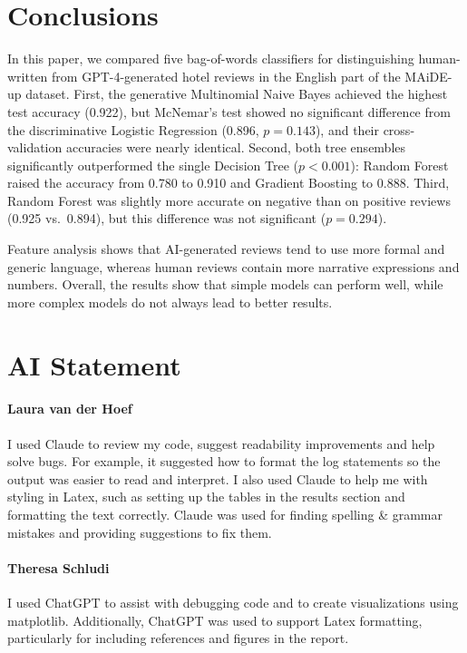 \documentclass[pmlr]{jmlr}%
\begin{document}
\section{Conclusions}
\label{sec:conclusions}

In this paper, we compared five bag-of-words classifiers for distinguishing human-written from GPT-4-generated hotel reviews in the English part of the MAiDE-up dataset.
First, the generative Multinomial Naive Bayes achieved the highest test accuracy (0.922), but McNemar's test showed no significant difference from the discriminative Logistic Regression (0.896, $p = 0.143$), and their cross-validation accuracies were nearly identical.
Second, both tree ensembles significantly outperformed the single Decision Tree ($p < 0.001$): Random Forest raised the accuracy from 0.780 to 0.910 and Gradient Boosting to 0.888.
Third, Random Forest was slightly more accurate on negative than on positive reviews (0.925 vs.\ 0.894), but this difference was not significant ($p = 0.294$).

Feature analysis shows that AI-generated reviews tend to use more formal and generic language, whereas human reviews contain more narrative expressions and numbers.
Overall, the results show that simple models can perform well, while more complex models do not always lead to better results.



\section*{AI Statement}

\paragraph{Laura van der Hoef}

I used Claude to review my code, suggest readability improvements and help solve bugs. For example, it suggested how to format the log statements so the output was easier to read and interpret.
I also used Claude to help me with styling in Latex, such as setting up the tables in the results section and formatting the text correctly.
Claude was used for finding spelling \& grammar mistakes and providing suggestions to fix them.

\paragraph{Theresa Schludi}
I used ChatGPT to assist with debugging code and to create visualizations using matplotlib. 
Additionally, ChatGPT was used to support Latex formatting, particularly for including references and figures in the report.
\end{document}
